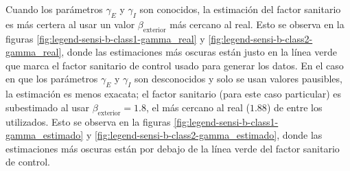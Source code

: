 Cuando los parámetros \(\gamma_E\) y \(\gamma_I\) son conocidos, la estimación del factor sanitario es más certera al usar un valor \(\beta_{\text{exterior}}\) más cercano al real. Esto se observa en la figuras \ref{fig:legend-sensi-b-class1-gamma_real} y \ref{fig:legend-sensi-b-class2-gamma_real}, donde las estimaciones más oscuras están justo en la línea verde que marca el factor sanitario de control usado para generar los datos. En el caso en que los parámetros \(\gamma_E\) y \(\gamma_I\) son desconocidos y solo se usan valores pausibles, la estimación es menos exacata; el factor sanitario (para este caso particular) es subestimado al usar \(\beta_{\text{exterior}} = 1.8\), el más cercano al real (\(1.88\)) de entre los utilizados. Esto se observa en la figuras \ref{fig:legend-sensi-b-class1-gamma_estimado} y \ref{fig:legend-sensi-b-class2-gamma_estimado}, donde las estimaciones más oscuras están por debajo de la línea verde del factor sanitario de control.



